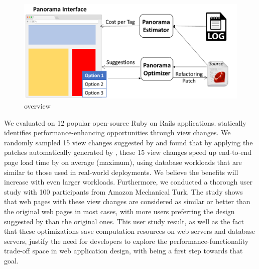 




\begin{figure}
    \centering
    \includegraphics[width=0.7\columnwidth]{panorama-figs/overview.pdf}
    \vspace{-0.1in}
    \caption{\ToolP overview}
     \vspace{-0.2in}
    \label{fig:overview}
\end{figure}


We evaluated \ToolP on 12 popular open-source Ruby on Rails applications.
\ToolP statically identifies \numissues performance-enhancing
opportunities through view changes. We randomly sampled 15 view changes suggested
by \ToolP and found that by applying the patches automatically generated by \Tool,
these 15 view changes speed up end-to-end page load time by \eoespeedup on average
(\maxspeedup maximum), using database workloads that are similar to those used in real-world deployments. We believe the benefits will increase with even larger workloads. %
Furthermore, we conducted a thorough user study with 100 participants from
Amazon Mechanical Turk. The study shows that web pages with these
view changes are considered as similar or better than the original web pages
in most cases, with more users preferring the design suggested by
\ToolP than the original ones. This user study result, as well as the fact 
that these optimizations save computation resources on web servers and database servers, justify the need for developers to explore the performance-functionality 
trade-off space in web application design, with \ToolP being a first step towards that goal.